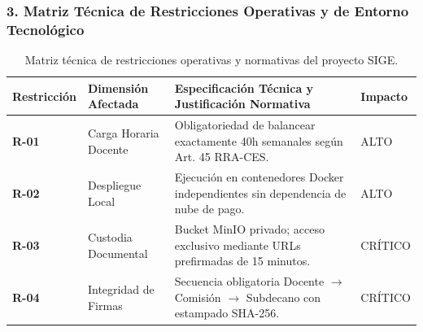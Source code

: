 \documentclass[12pt,a4paper]{article}
\begin{document}
\subsubsection*{3. Matriz Técnica de Restricciones Operativas y de Entorno Tecnológico}
\begin{table}[H]
\centering
\small
\renewcommand{\arraystretch}{1.2}
\begin{tabularx}{\textwidth}{|>{\hsize=0.6\hsize\centering\arraybackslash\bfseries\footnotesize}X|>{\hsize=1.2\hsize\raggedright\arraybackslash\footnotesize}X|>{\hsize=1.6\hsize\raggedright\arraybackslash\footnotesize}X|>{\hsize=0.6\hsize\centering\arraybackslash\footnotesize}X|}
\hline
\rowcolor{tableheader}
\textbf{Restricción} & \textbf{Dimensión Afectada} & \textbf{Especificación Técnica y Justificación Normativa} & \textbf{Impacto} \\
\hline
R-01 & Carga Horaria Docente & Obligatoriedad de balancear exactamente 40h semanales según Art. 45 RRA-CES. & ALTO \\
\hline
R-02 & Despliegue Local & Ejecución en contenedores Docker independientes sin dependencia de nube de pago. & ALTO \\
\hline
R-03 & Custodia Documental & Bucket MinIO privado; acceso exclusivo mediante URLs prefirmadas de 15 minutos. & CRÍTICO \\
\hline
R-04 & Integridad de Firmas & Secuencia obligatoria Docente $\to$ Comisión $\to$ Subdecano con estampado SHA-256. & CRÍTICO \\
\hline
\end{tabularx}
\caption{Matriz técnica de restricciones operativas y normativas del proyecto SIGE.}
\end{table}
\end{document}
